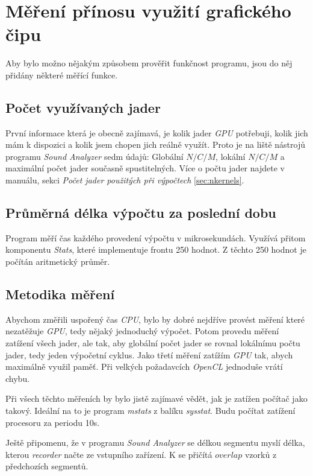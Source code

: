 \chapter{Měření přínosu využití grafického čipu}
\label{kap:measurement}

Aby bylo možno nějakým způsobem prověřit funkčnost programu, jsou do něj přidány některé měřící funkce.

\section{Počet využívaných jader}

První informace která je obecně zajímavá, je kolik jader \emph{GPU} potřebuji, kolik jich mám k dispozici a kolik jsem chopen jich reálně využít. Proto je na liště nástrojů programu \emph{Sound Analyzer} sedm údajů: Globální $N/C/M$, lokální $N/C/M$ a maximální počet jader současně spustitelných. Více o počtu jader najdete v manuálu, sekci \emph{Počet jader použitých při výpočtech} \ref{sec:nkernels}.

\section{Průměrná délka výpočtu za poslední dobu}

Program měří čas každého provedení výpočtu v mikrosekundách. Využívá přitom komponentu \emph{Stats}, které implementuje frontu 250 hodnot. Z těchto 250 hodnot je počítán aritmetický průměr.


\section{Metodika měření}

Abychom změřili uspořený čas \emph{CPU}, bylo by dobré nejdříve provést měření které nezatěžuje \emph{GPU}, tedy nějaký jednoduchý výpočet. Potom provedu měření zatížení všech jader, ale tak, aby globální počet jader se rovnal lokálnímu počtu jader, tedy jeden výpočetní cyklus. Jako třetí měření zatížím \emph{GPU} tak, abych maximálně využil paměť. Při velkých požadavcích \emph{OpenCL} jednoduše vrátí chybu.


Při všech těchto měřeních by bylo jistě zajímavé vědět, jak je zatížen počítač jako takový. Ideální na to je program \emph{mstats} z balíku \emph{sysstat}. Budu počítat zatížení procesoru za periodu 10s.


Ještě připomenu, že v programu \emph{Sound Analyzer} se délkou segmentu myslí délka, kterou \emph{recorder} načte ze vstupního zařízení. K se přičítá $overlap$ vzorků z předchozích segmentů.


